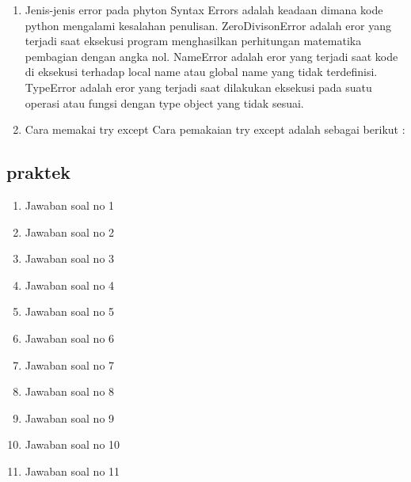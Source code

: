 \begin{enumerate}
\begin{enumerate}
    \item Jenis-jenis error pada phyton
Syntax Errors adalah keadaan dimana kode python mengalami kesalahan penulisan. 
ZeroDivisonError adalah eror yang terjadi saat eksekusi program menghasilkan perhitungan matematika pembagian dengan angka nol.
NameError adalah eror yang terjadi saat kode di eksekusi terhadap local name atau global name yang tidak terdefinisi. 
TypeError adalah eror yang terjadi saat dilakukan eksekusi pada suatu operasi atau fungsi dengan type object yang tidak sesuai.

    \item Cara memakai try except
Cara pemakaian try except adalah sebagai berikut :


\end{enumerate}

\subsection{praktek}
\begin{enumerate}
    \item Jawaban soal no 1
    
    \item Jawaban soal no 2
    
    \item Jawaban soal no 3
    
    \item Jawaban soal no 4
    
    \item Jawaban soal no 5
    
    \item Jawaban soal no 6
    
    \item Jawaban soal no 7
    
    \item Jawaban soal no 8
    
    \item Jawaban soal no 9
    
    \item Jawaban soal no 10
    
    \item Jawaban soal no 11
    
\end{enumerate}


\end{enumerate}
